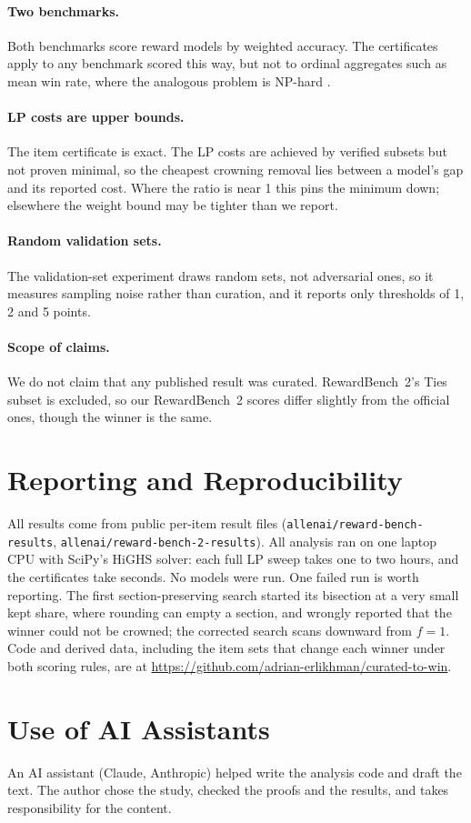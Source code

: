 \documentclass[11pt]{article}
\begin{document}
\paragraph{Two benchmarks.} Both benchmarks score reward models by weighted accuracy. The certificates apply to any benchmark scored this way, but not to ordinal aggregates such as mean win rate, where the analogous problem is NP-hard \citep{gordienko2026rig}.

\paragraph{LP costs are upper bounds.} The item certificate is exact. The LP costs are achieved by verified subsets but not proven minimal, so the cheapest crowning removal lies between a model's gap and its reported cost. Where the ratio is near 1 this pins the minimum down; elsewhere the weight bound may be tighter than we report.

\paragraph{Random validation sets.} The validation-set experiment draws random sets, not adversarial ones, so it measures sampling noise rather than curation, and it reports only thresholds of 1, 2 and 5 points.

\paragraph{Scope of claims.} We do not claim that any published result was curated. RewardBench~2's Ties subset is excluded, so our RewardBench~2 scores differ slightly from the official ones, though the winner is the same.

\section*{Reporting and Reproducibility}
All results come from public per-item result files (\texttt{allenai/reward-bench-results}, \texttt{allenai/reward-bench-2-results}). All analysis ran on one laptop CPU with SciPy's HiGHS solver: each full LP sweep takes one to two hours, and the certificates take seconds. No models were run. One failed run is worth reporting. The first section-preserving search started its bisection at a very small kept share, where rounding can empty a section, and wrongly reported that the winner could not be crowned; the corrected search scans downward from $f=1$. Code and derived data, including the item sets that change each winner under both scoring rules, are at \url{https://github.com/adrian-erlikhman/curated-to-win}.

\section*{Use of AI Assistants}
An AI assistant (Claude, Anthropic) helped write the analysis code and draft the text. The author chose the study, checked the proofs and the results, and takes responsibility for the content.


\end{document}
